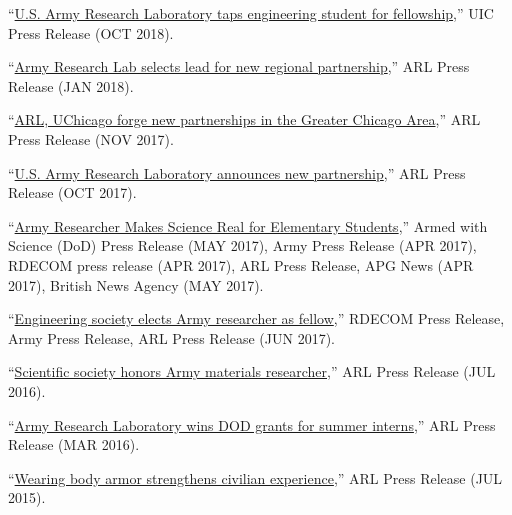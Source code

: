 \begin{cvlist}
\item
``\href{https://today.uic.edu/u-s-army-research-laboratory-taps-engineering-student-for-fellowship}{U.S. Army Research Laboratory taps engineering student for fellowship},'' UIC Press Release (OCT 2018).

\item
``\href{https://www.army.mil/article/199128/army_research_lab_selects_lead_for_new_regional_partnership}{Army Research Lab selects lead for new regional partnership},'' ARL Press Release (JAN 2018).

\item
``\href{https://www.army.mil/article/196840/arl_uchicago_forge_new_partnerships_in_the_greater_chicago_area}{ARL, UChicago forge new partnerships in the Greater Chicago Area},'' ARL Press Release (NOV 2017).

\item
``\href{https://www.army.mil/article/195649/us_army_research_laboratory_announces_new_partnership}{U.S. Army Research Laboratory announces new partnership},'' ARL Press Release (OCT 2017).

\item
``\href{https://www.army.mil/article/186569/army_materials_researcher_shares_passion_for_science_with_kids}{Army Researcher Makes Science Real for Elementary Students},'' Armed with Science (DoD) Press Release (MAY 2017), Army Press Release (APR 2017), RDECOM press release (APR 2017), ARL Press Release, APG News (APR 2017), British News Agency (MAY 2017).

\item
``\href{https://www.army.mil/article/189539/engineering_society_elects_army_researcher_as_fellow}{Engineering society elects Army researcher as fellow},'' RDECOM Press Release, Army Press Release, ARL Press Release (JUN 2017).

\item
``\href{https://www.army.mil/article/170983/scientific_society_honors_army_materials_researcher}{Scientific society honors Army materials researcher},'' ARL Press Release (JUL 2016).

\item
``\href{https://www.army.mil/article/164168/army_research_laboratory_wins_dod_grants_for_summer_interns}{Army Research Laboratory wins DOD grants for summer interns},'' ARL Press Release (MAR 2016).

\item
``\href{https://www.army.mil/article/151804/wearing_body_armor_strengthens_civilian_experience}{Wearing body armor strengthens civilian experience},'' ARL Press Release (JUL 2015).


\end{cvlist}
